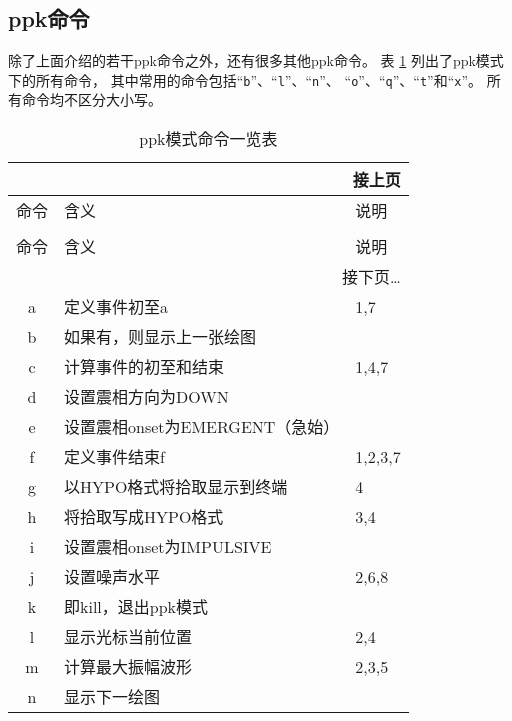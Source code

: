 \subsection{ppk命令}
除了上面介绍的若干ppk命令之外，还有很多其他ppk命令。
表 \ref{table:plotpk-commands} 列出了ppk模式下的所有命令，
其中常用的命令包括``\texttt{b}''、``\texttt{l}''、``\texttt{n}''、
``\texttt{o}''、``\texttt{q}''、``\texttt{t}''和``\texttt{x}''。
所有命令均不区分大小写。

\begin{center}
\small\ttfamily
\begin{longtable}{cll}
\multicolumn{3}{r}{接上页} \\
\toprule
命令    &   含义    &   说明    \\
\midrule
\endhead
\caption{ppk模式命令一览表} \label{table:plotpk-commands}   \\
\toprule
命令    &   含义    &   说明    \\
\midrule
\endfirsthead
\bottomrule
\multicolumn{3}{r}{接下页\dots} \\
\endfoot
\bottomrule
\endlastfoot
a       &   定义事件初至a                           &   1,7     \\
b       &   如果有，则显示上一张绘图                &           \\
c       &   计算事件的初至和结束                    &   1,4,7   \\
d       &   设置震相方向为DOWN                      &           \\
e       &   设置震相onset为EMERGENT（急始）         &           \\
f       &   定义事件结束f                           &  1,2,3,7  \\
g       &   以HYPO格式将拾取显示到终端              &   4       \\
h       &   将拾取写成HYPO格式                      &   3,4     \\
i       &   设置震相onset为IMPULSIVE                &           \\
j       &   设置噪声水平                            &   2,6,8   \\
k       &   即kill，退出ppk模式                     &           \\
l       &   显示光标当前位置                        &   2,4     \\
m       &   计算最大振幅波形                        &   2,3,5   \\
n       &   显示下一绘图                            &           \\

\end{longtable}
\end{center}
